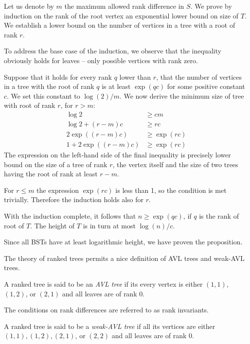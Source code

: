 \begin{myproof}
Let us denote by $m$ the maximum allowed rank difference in $S$.
We prove by induction on the rank of the root vertex an exponential lower bound on size of $T$. We establish a lower bound on the number of vertices in a tree with a root of rank $r$. 

To address the base case of the induction, we observe that the inequality obviously holds for leaves -- only possible vertices with rank zero.

Suppose that it holds for every rank $q$ lower than $r$, that the number of vertices in a tree with the root of rank $q$ is at least $\exp(qc)$ for some positive constant $c$. We set this constant to $\log(2)/m$.
We now derive the minimum size of tree with root of rank $r$, for $r>m$:
\begin{align*}
	\log 2            & \geq cm       \\
	\log 2 + (r-m)c   & \geq rc       \\
	2\exp((r-m)c) & \geq \exp(rc) \\
	1 + 2\exp((r-m)c) & \geq \exp(rc)
\end{align*}
The expression on the left-hand side of the final inequality is precisely lower bound on the size of a tree of rank $r$, the vertex itself and the size of two trees having the root of rank at least $r-m$.

For $r \leq m$ the expression $\exp(rc)$ is less than 1, so the condition is met trivially. Therefore the induction holds also for $r$.

With the induction complete, it follows that $n \geq \exp(qc)$, if $q$ is the rank of root of $T$. The height of $T$ is in turn at most $ \log(n)/c $. 

Since all BSTs have at least logarithmic height, we have proven the proposition.
\end{myproof}

The theory of ranked trees permits a nice definition of AVL trees \cite{avl} and weak-AVL trees.

\begin{defn}
A ranked tree is said to be an {\em AVL tree} if its every vertex is either $(1,1)$, $(1,2)$, or $(2,1)$ and all leaves are of rank $0$.
\end{defn}

The conditions on rank differences are referred to as rank invariants.

\begin{defn}
A ranked tree is said to be a {\em weak-AVL tree} if all its vertices are either $(1,1), (1,2), (2,1)$, or $(2,2)$ and all leaves are of rank $0$.
\end{defn}

